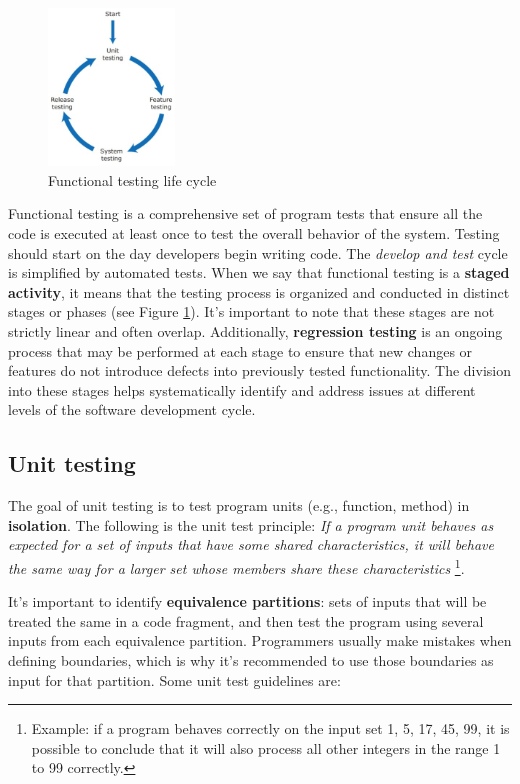 \begin{figure}
\includegraphics[width=0.3\textwidth]{images/Testing/functional-testing.png}
    \caption{Functional testing life cycle}
    \label{fig:functional-testing}
\end{figure}

Functional testing is a comprehensive set of program tests that ensure all the code is executed at least once to test the overall behavior of the system. Testing should start on the day developers begin writing code. The \textit{develop and test} cycle is simplified by automated tests. When we say that functional testing is a \textbf{staged activity}, it means that the testing process is organized and conducted in distinct stages or phases (see Figure \ref{fig:functional-testing}). It's important to note that these stages are not strictly linear and often overlap. Additionally, \textbf{regression testing} is an ongoing process that may be performed at each stage to ensure that new changes or features do not introduce defects into previously tested functionality. The division into these stages helps systematically identify and address issues at different levels of the software development cycle.

\subsection{Unit testing}

The goal of unit testing is to test program units (e.g., function, method) in \textbf{isolation}. The following is the unit test principle: \emph{If a program unit behaves as expected for a set of inputs that have some shared characteristics, it will behave the same way for a larger set whose members share these characteristics} \footnote{Example: if a program behaves correctly on the input set {1, 5, 17, 45, 99}, it is possible to conclude that it will also process all other integers in the range 1 to 99 correctly.}.

It's important to identify \textbf{equivalence partitions}: sets of inputs that will be treated the same in a code fragment, and then test the program using several inputs from each equivalence partition. Programmers usually make mistakes when defining boundaries, which is why it's recommended to use those boundaries as input for that partition. Some unit test guidelines are:

